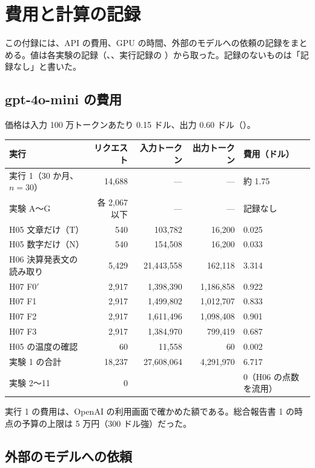 \chapter{費用と計算の記録}\label{app:cost}

この付録には、API の費用、GPU の時間、外部のモデルへの依頼の記録をまとめる。値は各実験の記録（、、実行記録の ）から取った。記録のないものは「記録なし」と書いた。

\section{gpt-4o-mini の費用}

価格は入力 100 万トークンあたり 0.15 ドル、出力 0.60 ドル（）。

\begin{longtable}{P{4.4cm}rrrP{2.4cm}}
\toprule
\textbf{実行} & \textbf{リクエスト} & \textbf{入力トークン} & \textbf{出力トークン} & \textbf{費用（ドル）} \\
\midrule
\endhead
\bottomrule
\endfoot
実行 1（30 か月、$n=30$） & 14,688 & — & — & 約 1.75 \\
実験 A〜G & 各 2,067 以下 & — & — & 記録なし \\
H05 文章だけ（T） & 540 & 103,782 & 16,200 & 0.025 \\
H05 数字だけ（N） & 540 & 154,508 & 16,200 & 0.033 \\
H06 決算発表文の読み取り & 5,429 & 21,443,558 & 162,118 & 3.314 \\
H07 F0$'$ & 2,917 & 1,398,390 & 1,186,858 & 0.922 \\
H07 F1 & 2,917 & 1,499,802 & 1,012,707 & 0.833 \\
H07 F2 & 2,917 & 1,611,496 & 1,098,408 & 0.901 \\
H07 F3 & 2,917 & 1,384,970 & 799,419 & 0.687 \\
H05 の温度の確認 & 60 & 11,558 & 60 & 0.002 \\
\midrule
実験 1 の合計 & 18,237 & 27,608,064 & 4,291,970 & 6.717 \\
実験 2〜11 & 0 & & & 0（H06 の点数を流用） \\
\end{longtable}

実行 1 の費用は、OpenAI の利用画面で確かめた額である。総合報告書 1 の時点の予算の上限は 5 万円（300 ドル強）だった。

\section{外部のモデルへの依頼}

